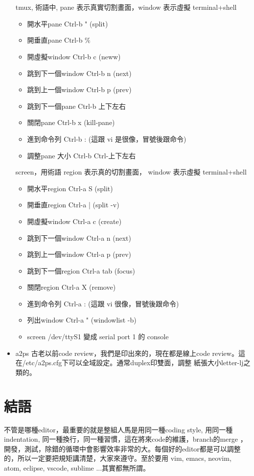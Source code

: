 \begin{itemize}
        \\\\
        tmux, 術語中, pane 表示真實切割畫面，window 表示虛擬 terminal+shell
        \begin{itemize}
          \item 開水平pane Ctrl-b " (split)
          \item 開垂直pane Ctrl-b \%
          \item 開虛擬window Ctrl-b c  (neww)
          \item 跳到下一個window Ctrl-b n (next)
          \item 跳到上一個window Ctrl-b p (prev)
          \item 跳到下一個pane Ctrl-b 上下左右
          \item 關閉pane Ctrl-b x (kill-pane)
          \item 進到命令列 Ctrl-b :  (這跟 vi 是很像，冒號後跟命令)
          \item 調整pane 大小 Ctrl-b Ctrl-上下左右
        \end{itemize}
        screen，用術語 region 表示真的切割畫面， window 表示虛擬 terminal+shell
        \begin{itemize}
          \item 開水平region Ctrl-a S  (split)
          \item 開垂直region Ctrl-a |  (split -v)
          \item 開虛擬window Ctrl-a c  (create)
          \item 跳到下一個window Ctrl-a n (next)
          \item 跳到上一個window Ctrl-a p (prev)
          \item 跳到下一個region Ctrl-a tab (focus)
          \item 關閉region Ctrl-a X (remove)
          \item 進到命令列 Ctrl-a : (這跟 vi 很像，冒號後跟命令)
          \item 列出window Ctrl-a " (windowlist -b)
          \item screen /dev/ttyS1 變成 serial port 1 的 console
        \end{itemize}
      \item a2ps 古老以前code review，我們是印出來的，現在都是線上code
        review。這在/etc/a2ps.cfg下可以全域設定。通常duplex印雙面，調整
        紙張大小letter-lj之類的。
    \end{itemize}
    \section{結語}
    不管是哪種editor，最重要的就是整組人馬是用同一種coding style, 用同一種
    indentation, 同一種換行，同一種習慣，這在將來code的維護，branch的merge
    ，開發，測試，除錯的循環中會影響效率非常的大。每個好的editor都是可以調整
    的，所以一定要把規矩講清楚，大家來遵守。至於要用 vim, emacs, neovim, 
    atom, eclipse, vscode, sublime ...其實都無所謂。
